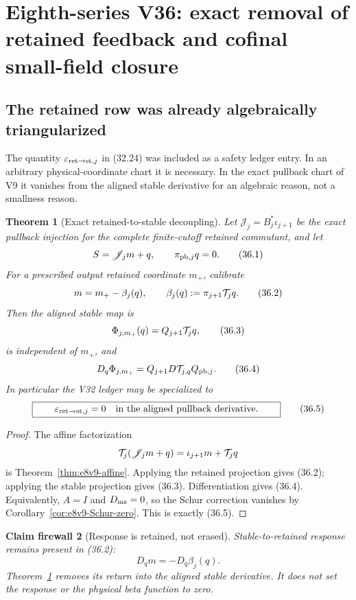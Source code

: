 \documentclass[11pt,oneside]{book}
\newtheorem{theorem}{Theorem}[chapter]
\newtheorem{firewall}[theorem]{Claim firewall}
\theoremstyle{definition}
\theoremstyle{remark}
\begin{document}
\section{Eighth-series V36: exact removal of retained feedback and
cofinal small-field closure}

\subsection{The retained row was already algebraically triangularized}

The quantity
\(\varepsilon_{{\rm ret}\to{\rm st},j}\) in (32.24) was included as
a safety ledger entry.  In an arbitrary physical-coordinate chart it
is necessary.  In the exact pullback chart of V9 it vanishes from the
aligned stable derivative for an algebraic reason, not a smallness
reason.

\begin{theorem}[Exact retained-to-stable decoupling]
\label{thm:e8v36-exact-decoupling}
Let \({\mathscr J}_j=B_j^*\iota_{j+1}\) be the exact pullback
injection for the complete finite-cutoff retained commutant, and let
\[
 S={\mathscr J}_jm+q,\qquad \pi_{{\rm pb},j}q=0.                  \tag{36.1}
\]
For a prescribed output retained coordinate \(m_+\), calibrate
\[
                         m=m_+-\beta_j(q),\qquad
 \beta_j(q):=\pi_{j+1}{\cal T}_jq.                              \tag{36.2}
\]
Then the aligned stable map is
\[
 \Phi_{j,m_+}(q)=Q_{j+1}{\cal T}_jq,                             \tag{36.3}
\]
is independent of \(m_+\), and
\[
 D_q\Phi_{j,m_+}
 =
 Q_{j+1}D{\cal T}_{j,q}Q_{{\rm pb},j}.                           \tag{36.4}
\]
In particular the V32 ledger may be specialized to
\[
\boxed{\qquad
 \varepsilon_{{\rm ret}\to{\rm st},j}=0
 \quad\text{in the aligned pullback derivative.}
\qquad}                                                         \tag{36.5}
\]
\end{theorem}

\begin{proof}
The affine factorization
\[
 {\cal T}_j({\mathscr J}_jm+q)
 =\iota_{j+1}m+{\cal T}_jq
\]
is Theorem~\ref{thm:e8v9-affine}.  Applying the retained projection
gives (36.2); applying the stable projection gives (36.3).
Differentiation gives (36.4).  Equivalently,
\(A=I\) and \(D_{\rm ms}=0\), so the Schur correction vanishes by
Corollary~\ref{cor:e8v9-Schur-zero}.  This is exactly (36.5).
\end{proof}

\begin{firewall}[Response is retained, not erased]
\label{fire:e8v36-response}
Stable-to-retained response remains present in (36.2):
\[
                              D_qm=-D_q\beta_j(q).                \tag{36.6}
\]
Theorem~\ref{thm:e8v36-exact-decoupling} removes its return into the
aligned stable derivative.  It does not set the response or the
physical beta function to zero.
\end{firewall}
\end{document}
